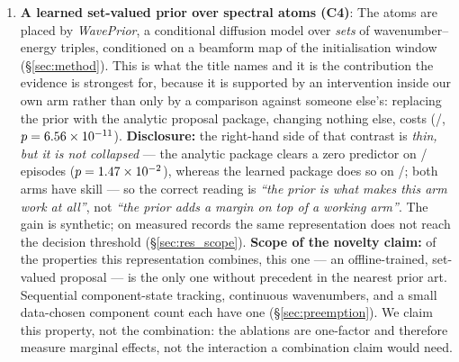 \documentclass[review]{elsarticle}
\begin{document}
\begin{enumerate}
    was \emph{better} in both the sparse and the crowded stratum.
    It is retained below only as a reported negative result.
  \item \textbf{A learned set-valued prior over spectral atoms (C4)}: The atoms are
    placed by \emph{WavePrior}, a conditional diffusion model over \emph{sets} of
    wavenumber--energy triples, conditioned on a beamform map of the
    initialisation window (\S\ref{sec:method}).
    This is what the title names and it
    is the contribution the evidence is strongest for, because it is supported by an
    intervention inside our own arm rather than only by a comparison against
    someone else's: replacing the prior with the analytic proposal package, changing
    nothing else, costs \BTwentyTwoRel{}
    (\BTwentyTwoBetter{}/\BTwentyTwoN{}, $p = 6.56\times 10^{-11}{}$).
    \textbf{Disclosure:} the right-hand side of that contrast is \emph{thin, but it
    is not collapsed} --- the analytic package clears a zero predictor on
    \BTwentyTwoAnaShipZero{}/\BTwentyTwoN{} episodes
    ($p = 1.47\times 10^{-2}{}$), whereas the learned package does
    so on \BTwentyTwoLearnZero{}/\BTwentyTwoN{}; both arms have skill --- so the correct reading is
    \emph{``the prior is what makes this arm work at all''}, not \emph{``the prior
    adds a margin on top of a working arm''}. The gain is synthetic; on measured
    records the same representation does not reach the decision threshold
    (\S\ref{sec:res_scope}).
    \textbf{Scope of the novelty claim:} of the properties this representation
    combines, this one --- an offline-trained, set-valued proposal --- is the only
    one without precedent in the nearest prior art. Sequential component-state
    tracking, continuous wavenumbers, and a small data-chosen component count each
    have one (\S\ref{sec:preemption}). We claim this property, not the combination:
    the ablations are one-factor and therefore measure marginal effects, not the
    interaction a combination claim would need.
\end{enumerate}
\end{document}
